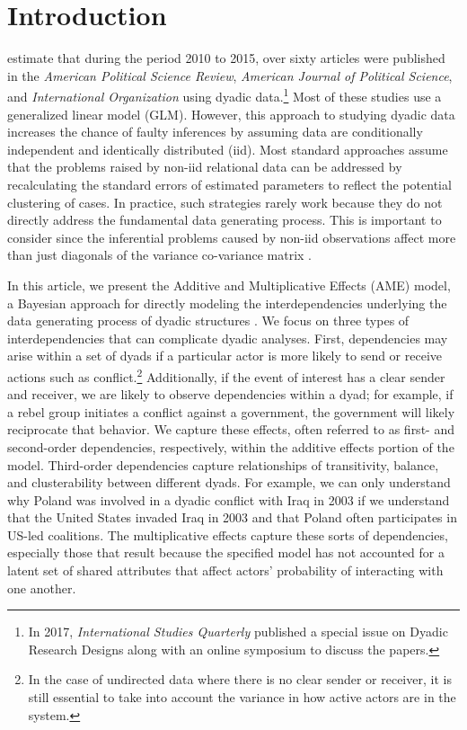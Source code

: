 \section{\textbf{Introduction}}

\citet{aronow:etal:2015} estimate that during the period 2010 to 2015, over sixty articles were published in the \textit{American Political Science Review}, \textit{American Journal of Political Science}, and \textit{International Organization} using dyadic data.\footnote{In 2017, \textit{International Studies Quarterly} published a special issue on Dyadic Research Designs along with an online symposium to discuss the papers.} Most of these studies use a generalized linear model (GLM).  However, this approach to studying dyadic data increases the chance of faulty inferences by assuming data are conditionally independent and identically distributed (iid). Most standard approaches assume that the problems raised by non-iid relational data can be addressed by recalculating the standard errors of estimated parameters to reflect the potential clustering of cases. In practice, such strategies rarely work because they do not directly address the fundamental data generating process. This is important to consider since the inferential problems caused by non-iid  observations affect more than just diagonals of the variance co-variance matrix \citep{beck:2012,franzese:hayes:2007,king:roberts:2014}.

In this article, we present the Additive and Multiplicative Effects (AME) model, a Bayesian approach for directly modeling the interdependencies underlying the data generating process of dyadic structures \citep{hoff:2008,minhas:etal:2016:arxiv}. We focus on three types of interdependencies that can complicate dyadic analyses. First, dependencies may arise within a set of dyads if a particular actor is more likely to send or receive actions such as conflict.\footnote{In the case of undirected data where there is no clear sender or receiver, it is still essential to take into account the variance in how active actors are in the system.} Additionally, if the event of interest has a clear sender and receiver, we are likely to observe dependencies within a dyad; for example, if a rebel group initiates a conflict against a government, the government will likely reciprocate that behavior. We capture these effects, often referred to as first- and second-order dependencies, respectively, within the additive effects portion of the model. Third-order dependencies capture relationships of transitivity, balance, and clusterability between different dyads. For example, we can only understand why Poland was involved in a dyadic conflict with Iraq in 2003 if we understand that the United States invaded Iraq in 2003 and that Poland often participates in US-led coalitions. The multiplicative effects capture these sorts of dependencies, especially those that result because the specified model has not accounted for a latent set of shared attributes that affect actors' probability of interacting with one another.  

